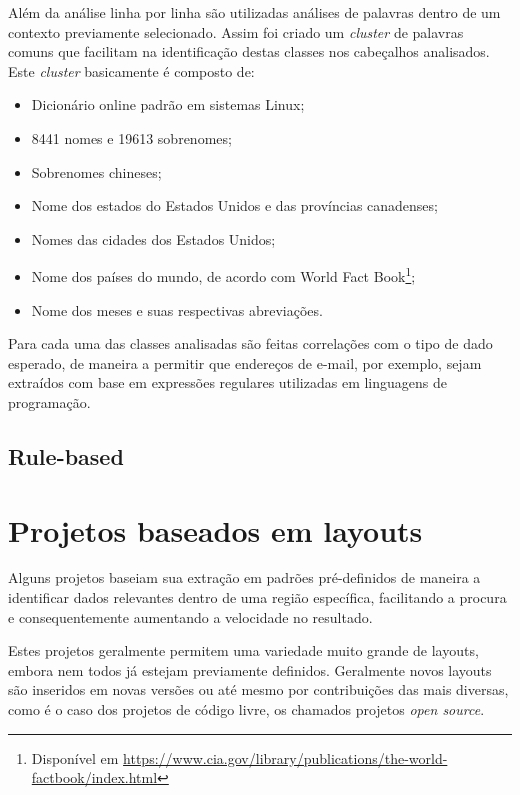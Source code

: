 \documentclass[
	12pt,               %
	openright,          %
	twoside,            %
	a4paper,            %
	english,            %
	brazil              %
	]{abntex2}
\begin{document}
Além da análise linha por linha são utilizadas análises de palavras dentro de um contexto previamente selecionado. Assim foi criado um \textit{cluster} de palavras comuns que facilitam na identificação destas classes nos cabeçalhos analisados. Este \textit{cluster} basicamente é composto de:

\begin{itemize}
\item Dicionário online padrão em sistemas Linux;
\item 8441 nomes e 19613 sobrenomes;
\item Sobrenomes chineses;
\item Nome dos estados do Estados Unidos e das províncias canadenses;
\item Nomes das cidades dos Estados Unidos;
\item Nome dos países do mundo, de acordo com World Fact Book\footnote{Disponível em \url{https://www.cia.gov/library/publications/the-world-factbook/index.html}};
\item Nome dos meses e suas respectivas abreviações.
\end{itemize}

Para cada uma das classes analisadas são feitas correlações com o tipo de dado esperado, de maneira a permitir que endereços de e-mail, por exemplo, sejam extraídos com base em expressões regulares utilizadas em linguagens de programação.

\subsection{Rule-based}






\section{Projetos baseados em layouts}

Alguns projetos baseiam sua extração em padrões pré-definidos de maneira a identificar dados relevantes dentro de uma região específica, facilitando a procura e consequentemente aumentando a velocidade no resultado. 

Estes projetos geralmente permitem uma variedade muito grande de layouts, embora nem todos já estejam previamente definidos. Geralmente novos layouts são inseridos em novas versões ou até mesmo por contribuições das mais diversas, como é o caso dos projetos de código livre, os chamados projetos \textit{open source}.
\end{document}
